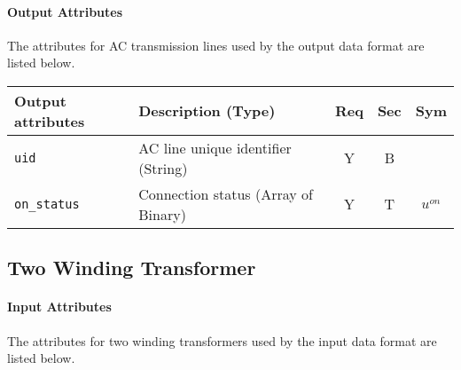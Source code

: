 \documentclass{article}
\begin{document}
\paragraph{Output Attributes}
The attributes for AC transmission lines used by the output data format are listed below.
\begin{center}
\small
\begin{tabular}{ l | l | c | c | c |}
Output attributes & Description (Type)& Req & Sec & Sym\\
\hline
 {\tt uid} & AC line unique identifier (String)& Y & B & \\
 {\tt on\_status} & Connection status (Array of Binary) & Y & T & $u^{on}$ \\
\hline
\end{tabular}
\end{center}
\subsection{Two Winding Transformer}
\label{nom:transformer}

\paragraph{Input Attributes}
The attributes for two winding transformers used by the
input data format are listed below.
\end{document}
